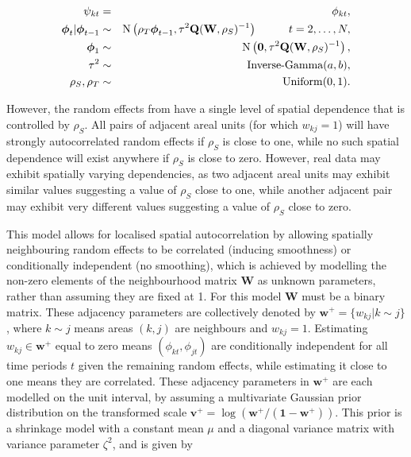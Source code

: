\documentclass[article, nojss]{jss}
\newcommand{\bd}[1]{\ensuremath{\mbox{\boldmath $#1$}}}
\begin{document}
\begin{eqnarray}
\psi_{kt}&=&\phi_{kt},\label{caradaptive1}\\
\bd{\phi}_t|\bd{\phi}_{t-1} & \sim & \mbox{N}\left(\rho_T\bd{\phi}_{t-1}, \tau^{2} \mathbf{Q}(\mathbf{W},\rho_S)^{-1}\right)\hspace{1cm} t=2,\ldots,N,\nonumber\\
\bd{\phi}_1 & \sim & \mbox{N}\left(\mathbf{0}, \tau^{2} \mathbf{Q}(\mathbf{W},\rho_S)^{-1}\right),\nonumber\\
\tau^2&\sim&\mbox{Inverse-Gamma}(a,b),\nonumber\\
\rho_S,\rho_T&\sim&\mbox{Uniform}(0,1).\nonumber
\end{eqnarray}


However, the random effects from   have a single level of spatial dependence that is controlled by $\rho_S$. All pairs of adjacent areal units (for which $w_{kj}=1$) will have strongly autocorrelated random effects if $\rho_S$ is close to one, while no such spatial dependence will exist anywhere if $\rho_S$ is close to zero. However, real data may exhibit spatially varying dependencies, as two adjacent areal units may exhibit similar values suggesting a value of $\rho_S$ close to one, while another adjacent pair may exhibit very different values suggesting a value of $\rho_S$ close to zero.

\hspace{1cm} This model allows for localised spatial autocorrelation by allowing spatially neighbouring  random effects to be correlated (inducing smoothness) or conditionally independent (no smoothing), which is  achieved by modelling the non-zero elements of the neighbourhood matrix $\mathbf{W}$  as unknown parameters, rather than assuming they are fixed at 1. For this model $\mathbf{W}$ must be a binary matrix. These adjacency parameters are collectively denoted by $\mathbf{w}^{+}=\{w_{kj}|k\sim j\}$, where $k\sim j$ means areas $(k,j)$ are neighbours and $w_{kj}=1$. Estimating $w_{kj}\in\mathbf{w}^{+}$ equal to zero means $(\phi_{kt}, \phi_{jt})$  are conditionally independent for all time periods $t$  given the remaining random effects, while estimating it close to one means they are correlated. These adjacency parameters in $\mathbf{w}^{+}$ are each modelled on the unit interval, by assuming a multivariate Gaussian prior distribution on the transformed scale $\mathbf{v}^+ = \log\left(\mathbf{w}^{+}/(\mathbf{1} - \mathbf{w}^{+}) \right)$.  This prior is a shrinkage model with a constant mean $\mu$ and a diagonal variance matrix with variance parameter $\zeta^2$, and is given by
\end{document}
